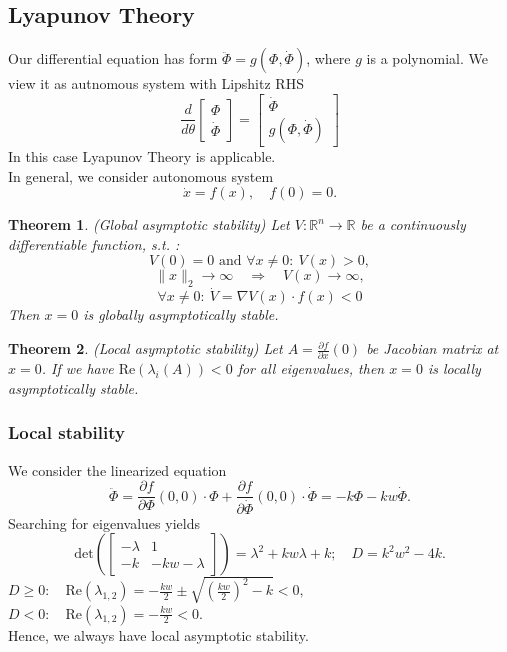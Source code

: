 \documentclass[12pt]{article}
\newtheorem{theorem}{Theorem}
\begin{document}
\newpage

\subsection*{Lyapunov Theory}
Our differential equation has form $ \ddot{\Phi} = g(\Phi, \dot{\Phi})$, where $g$ is a polynomial. We view it as autnomous system with Lipshitz RHS
$$  \frac{d}{d\theta} \begin{bmatrix} \Phi \\ \dot{\Phi} \end{bmatrix} = \begin{bmatrix} \dot{\Phi} \\ g(\Phi, \dot{\Phi}) \end{bmatrix} $$
In this case Lyapunov Theory is applicable. 
\\
In general, we consider autonomous system
$$ \dot{x} = f(x), \quad f(0) = 0.$$
\begin{theorem}(Global asymptotic stability) 
Let $V: \mathbb{R}^n \to \mathbb{R}$ be a continuously differentiable function, s.t. :
$$V(0) = 0 \text{ and } \forall x \neq 0: ~V(x) > 0  , $$
$$ \lVert x \rVert_2 \to \infty \quad \Rightarrow \quad V(x) \to \infty, $$
$$ \forall x \neq 0 :  ~\dot{V} =  \nabla V(x) \cdot f(x) < 0 $$
Then $x = 0$ is globally asymptotically stable.
\end{theorem}

\begin{theorem}(Local asymptotic stability)
Let $A = \frac{\partial f}{\partial x}(0)$ be Jacobian matrix at $x=0$. If we have $\mathrm{Re} (\lambda_i(A)) < 0$ for all eigenvalues, then $x = 0$ is locally asymptotically stable.

\end{theorem}

\subsubsection*{Local stability}
We consider the linearized equation 
$$\ddot{\Phi} = \frac{\partial f}{\partial \Phi}(0,0) \cdot \Phi + \frac{\partial f}{\partial \dot{\Phi}}(0,0) \cdot \dot{\Phi} = -k\Phi - kw\dot{\Phi} .$$
Searching for eigenvalues yields
$$ \mathrm{det} \left( \begin{bmatrix} -\lambda & 1 \\ -k & -kw - \lambda \end{bmatrix} \right) = \lambda^2 + kw \lambda + k; \quad D = k^2w^2 - 4k. $$
 $ D \geq 0: \quad \mathrm{Re}(\lambda_{1,2}) = -\frac{kw}{2} \pm \sqrt{ \left( \frac{kw}{2} \right)^2  -k } < 0,$
 \\
 $ D < 0: \quad  \mathrm{Re}(\lambda_{1,2}) = -\frac{kw}{2} < 0.$
 \\
Hence, we always have local asymptotic stability.
\end{document}
